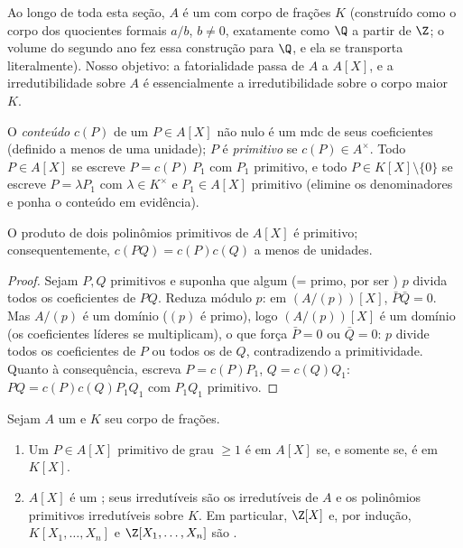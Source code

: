 Ao longo de toda esta seção, $A$ é um  com corpo de frações
$K$ (construído como o corpo dos quocientes formais $a/b$,
$b \neq 0$, exatamente como $\Q$ a partir de $\Z$; o volume do
segundo ano fez essa construção para $\Q$, e ela se transporta
literalmente). Nosso objetivo: a fatorialidade passa de $A$ a
$A[X]$, e a irredutibilidade sobre $A$ é essencialmente a
irredutibilidade sobre o corpo maior $K$.

\begin{definition}\label{def:b3:rings:content}
O \emph{conteúdo} $c(P)$ de um
$P \in A[X]$ não nulo é um mdc de seus coeficientes (definido a menos de uma
unidade); $P$ é \emph{primitivo} se $c(P) \in A^\times$. Todo $P
\in A[X]$ se escreve
$P = c(P)\,P_1$ com $P_1$ primitivo, e todo $P \in K[X]\setminus\{0\}$ se escreve $P = \lambda P_1$ com $\lambda
\in K^\times$ e
$P_1 \in A[X]$ primitivo (elimine os denominadores e ponha o conteúdo em
evidência).
\end{definition}

\begin{lemma}[Gauss]\label{lem:b3:rings:gauss}
O produto de dois polinômios primitivos de $A[X]$ é primitivo;
consequentemente, $c(PQ) = c(P)c(Q)$ a menos de unidades.
\end{lemma}

\begin{proof}
Sejam $P, Q$ primitivos e suponha que algum  (= primo,
por ser ) $p$ divida todos os coeficientes de $PQ$. Reduza
módulo $p$: em $(A/(p))[X]$, $\bar P \bar Q = 0$. Mas $A/(p)$ é um domínio ($(p)$
é primo), logo $(A/(p))[X]$ é um domínio (os coeficientes líderes se
multiplicam), o que força $\bar P = 0$ ou $\bar Q = 0$: $p$ divide todos os
coeficientes de $P$ ou todos os de $Q$, contradizendo a
primitividade. Quanto à consequência, escreva $P = c(P)P_1$, $Q = c(Q)Q_1$: $PQ =
c(P)c(Q) P_1Q_1$ com
$P_1Q_1$ primitivo.
\end{proof}

\begin{theorem}\label{thm:b3:rings:gaussufd}
Sejam $A$ um  e $K$ seu corpo de frações.
\begin{enumerate}
  \item Um $P \in A[X]$ primitivo de grau $\geq 1$ é  em
        $A[X]$ se, e somente se, é  em $K[X]$.
  \item $A[X]$ é um ; seus irredutíveis são os irredutíveis de
        $A$ e os polinômios primitivos irredutíveis sobre $K$.
        Em particular, $\Z[X]$ e, por indução, $K[X_1, \dots, X_n]$ e $\Z[X_1, \dots, X_n]$ são
        .
\end{enumerate}
\end{theorem}

